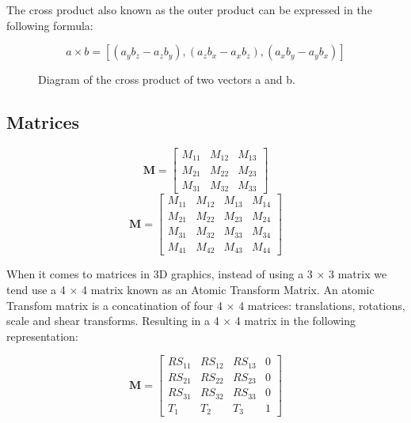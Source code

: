 The cross product also known as the outer product can be expressed in the following formula: 

\begin{equation}
a \times b = [(a_y b_z - a_z b_y), (a_z b_x - a_x b_z), (a_x b_y - a_y b_x)]
\end{equation}

\begin{figure}[htbp]
	{\centering
		\setlength{\fboxrule}{1pt}
		\vspace{7px}
		\caption{Diagram of the cross product of two vectors a and b.}
	}
\end{figure}
\FloatBarrier

\subsection{Matrices}
\begin{equation}
\textbf{M} = \begin{bmatrix}
M_{11} & M_{12} & M_{13} \\
M_{21} & M_{22} & M_{23} \\
M_{31} & M_{32} & M_{33}
\end{bmatrix}
\end{equation}
\begin{equation}
\textbf{M} = \begin{bmatrix}
M_{11} & M_{12} & M_{13} & M_{14}\\
M_{21} & M_{22} & M_{23} & M_{24}\\
M_{31} & M_{32} & M_{33} & M_{34}\\
M_{41} & M_{42} & M_{43} & M_{44}
\end{bmatrix}
\end{equation}

\begin{flushleft}
When it comes to matrices in 3D graphics, instead of using a 3 $\times$ 3 matrix we tend use a 4 $\times$ 4 matrix known as an Atomic Transform Matrix. An atomic Transfom matrix is a concatination of four 4 $\times$ 4 matrices: translations, rotations, scale and shear transforms. Resulting in a 4 $\times$ 4 matrix in the following representation: 
\end{flushleft}

\begin{equation}
\textbf{M} = \begin{bmatrix}
RS_{11} & RS_{12} & RS_{13} & 0\\
RS_{21} & RS_{22} & RS_{23} & 0\\
RS_{31} & RS_{32} & RS_{33} & 0\\
T_{1} & T_{2} & T_{3} & 1
\end{bmatrix}
\end{equation}

